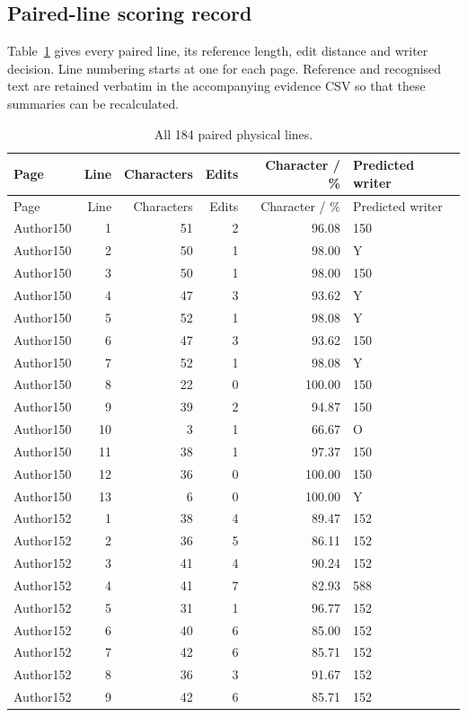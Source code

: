 \subsection{Paired-line scoring record}
Table~\ref{tab:app-all-lines} gives every paired line, its reference length, edit distance and writer decision. Line numbering starts at one for each page. Reference and recognised text are retained verbatim in the accompanying evidence CSV so that these summaries can be recalculated.
\begin{longtable}{lrrrrl}
\caption{All 184 paired physical lines.}\label{tab:app-all-lines}\\
\toprule Page & Line & Characters & Edits & Character / \% & Predicted writer\\\midrule\endfirsthead
\toprule Page & Line & Characters & Edits & Character / \% & Predicted writer\\\midrule\endhead
Author150 & 1 & 51 & 2 & 96.08 & 150\\
Author150 & 2 & 50 & 1 & 98.00 & Y\\
Author150 & 3 & 50 & 1 & 98.00 & 150\\
Author150 & 4 & 47 & 3 & 93.62 & Y\\
Author150 & 5 & 52 & 1 & 98.08 & Y\\
Author150 & 6 & 47 & 3 & 93.62 & 150\\
Author150 & 7 & 52 & 1 & 98.08 & Y\\
Author150 & 8 & 22 & 0 & 100.00 & 150\\
Author150 & 9 & 39 & 2 & 94.87 & 150\\
Author150 & 10 & 3 & 1 & 66.67 & O\\
Author150 & 11 & 38 & 1 & 97.37 & 150\\
Author150 & 12 & 36 & 0 & 100.00 & 150\\
Author150 & 13 & 6 & 0 & 100.00 & Y\\
Author152 & 1 & 38 & 4 & 89.47 & 152\\
Author152 & 2 & 36 & 5 & 86.11 & 152\\
Author152 & 3 & 41 & 4 & 90.24 & 152\\
Author152 & 4 & 41 & 7 & 82.93 & 588\\
Author152 & 5 & 31 & 1 & 96.77 & 152\\
Author152 & 6 & 40 & 6 & 85.00 & 152\\
Author152 & 7 & 42 & 6 & 85.71 & 152\\
Author152 & 8 & 36 & 3 & 91.67 & 152\\
Author152 & 9 & 42 & 6 & 85.71 & 152\\

\end{longtable}
